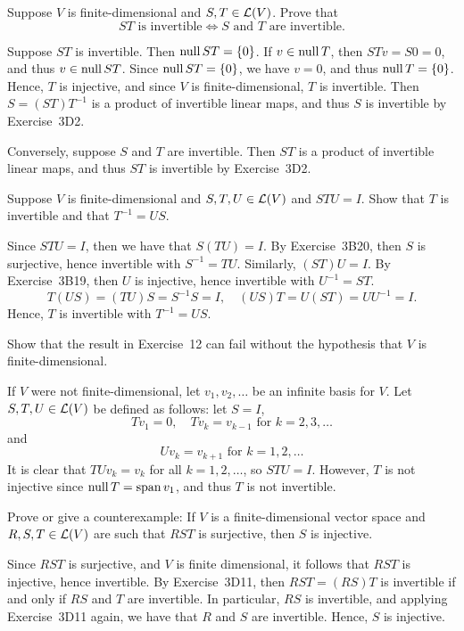 \begin{exc}
\begin{exercise}
Suppose $V$ is finite-dimensional and $S,T\in\mathcal{L}(V)$. Prove that
\[ ST \text{ is invertible} \iff S \text{ and } T \text{ are invertible}. \]
\end{exercise}
\begin{solution}
Suppose $ST$ is invertible. Then $\operatorname{null} ST=\{0\}$. If $v\in\operatorname{null} T$, then
$STv=S0=0$, and thus $v\in\operatorname{null} ST$. Since $\operatorname{null} ST=\{0\}$, we have $v=0$, and
thus $\operatorname{null} T=\{0\}$. Hence, $T$ is injective, and since $V$ is
finite-dimensional, $T$ is invertible. Then $S=(ST)T^{-1}$ is a product of
invertible linear maps, and thus $S$ is invertible by Exercise~3D2.

Conversely, suppose $S$ and $T$ are invertible. Then $ST$ is a product of
invertible linear maps, and thus $ST$ is invertible by Exercise~3D2.
\end{solution}

\begin{exercise}
Suppose $V$ is finite-dimensional and $S,T,U\in\mathcal{L}(V)$ and $STU=I$. Show that
$T$ is invertible and that $T^{-1}=US$.
\end{exercise}
\begin{solution}
Since $STU=I$, then we have that $S(TU)=I$. By Exercise~3B20, then $S$ is
surjective, hence invertible with $S^{-1}=TU$. Similarly, $(ST)U=I$. By
Exercise~3B19, then $U$ is injective, hence invertible with $U^{-1}=ST$.
\[ T(US) = (TU)S = S^{-1}S = I, \quad (US)T = U(ST) = UU^{-1} = I. \]
Hence, $T$ is invertible with $T^{-1}=US$.
\end{solution}

\begin{exercise}
Show that the result in Exercise~12 can fail without the hypothesis that $V$ is
finite-dimensional.
\end{exercise}
\begin{solution}
If $V$ were not finite-dimensional, let $v_1,v_2,\dots$ be an infinite basis for
$V$. Let $S,T,U\in\mathcal{L}(V)$ be defined as follows: let $S=I$,
\[ Tv_1 = 0, \quad Tv_k = v_{k-1} \text{ for } k=2,3,\dots \]
and
\[ Uv_k = v_{k+1} \text{ for } k=1,2,\dots \]
It is clear that $TUv_k=v_k$ for all $k=1,2,\dots$, so $STU=I$. However, $T$ is
not injective since $\operatorname{null} T=\operatorname{span} v_1$, and thus $T$ is not invertible.
\end{solution}

\begin{exercise}
Prove or give a counterexample: If $V$ is a finite-dimensional vector space and
$R,S,T\in\mathcal{L}(V)$ are such that $RST$ is surjective, then $S$ is injective.
\end{exercise}
\begin{solution}
Since $RST$ is surjective, and $V$ is finite dimensional, it follows that $RST$
is injective, hence invertible. By Exercise~3D11, then $RST=(RS)T$ is
invertible if and only if $RS$ and $T$ are invertible. In particular, $RS$ is
invertible, and applying Exercise~3D11 again, we have that $R$ and $S$ are
invertible. Hence, $S$ is injective.
\end{solution}


\end{exc}
